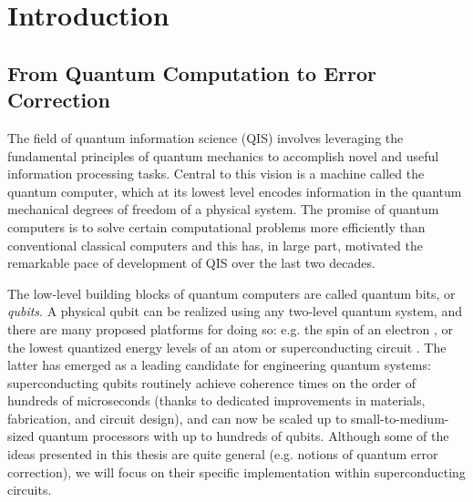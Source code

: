 \chapter{Introduction\label{ch:1_Introduction}}

\section{From Quantum Computation to Error Correction}

The field of quantum information science (QIS) involves leveraging the fundamental principles of quantum mechanics to accomplish novel and useful information processing tasks. Central to this vision is a machine called the quantum computer, which at its lowest level encodes information in the quantum mechanical degrees of freedom of a physical system. The promise of quantum computers is to solve certain computational problems more efficiently than conventional classical computers and this has, in large part, motivated the remarkable pace of development of QIS over the last two decades. 

The low-level building blocks of quantum computers are called quantum bits, or \textit{qubits}. A physical qubit can be realized using any two-level quantum system, and there are many proposed platforms for doing so: e.g. the spin of an electron \cite{burkard2023semiconductor}, or the lowest quantized energy levels of an atom \cite{briegel2000quantum} or superconducting circuit \cite{devoret2013superconducting, krantz2019quantum, kjaergaard2020superconducting}. The latter has emerged as a leading candidate for engineering quantum systems: superconducting qubits routinely achieve coherence times on the order of hundreds of microseconds \cite{kjaergaard2020superconducting} (thanks to dedicated improvements in materials, fabrication, and circuit design), and can now be scaled up to small-to-medium-sized quantum processors with up to hundreds of qubits. Although some of the ideas presented in this thesis are quite general (e.g. notions of quantum error correction), we will focus on their specific implementation within superconducting circuits. 

